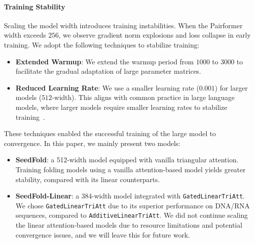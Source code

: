 \paragraph{Training Stability}
Scaling the model width introduces training instabilities. When the Pairformer width exceeds $256$, we observe gradient norm explosions and loss collapse in early training. We adopt the following techniques to stabilize training:

\begin{itemize}
    \item \textbf{Extended Warmup}: We extend the warmup period from $1000$ to $3000$ to facilitate the gradual adaptation of large parameter matrices.
    \item \textbf{Reduced Learning Rate}: We use a smaller learning rate ($0.001$) for larger models ($512$-width). This aligns with common practice in large language models, where larger models require smaller learning rates to stabilize training~\cite{touvron2023llama}.
\end{itemize}

These techniques enabled the successful training of the large model to convergence. In this paper, we mainly present two models: 

\begin{itemize}
    \item \textbf{SeedFold}: a 512-width model equipped with vanilla triangular attention. Training folding models using a vanilla attention-based model yields greater stability, compared with its linear counterparts.
    \item \textbf{SeedFold-Linear}: a 384-width model integrated with \texttt{GatedLinearTriAtt}. We chose \texttt{GatedLinearTriAtt} due to its superior performance on DNA/RNA sequences, compared to \texttt{AdditiveLinearTriAtt}. We did not continue scaling the linear attention-based models due to resource limitations and potential convergence issues, and we will leave this for future work.
\end{itemize}